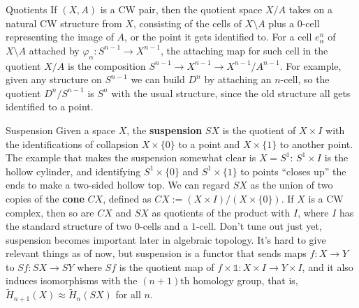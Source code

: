 \begin{namedthing}{Quotients}
    If $(X,A)$ is a CW pair, then the quotient space $X /A$ takes on a natural CW structure from $X$, consisting of the cells of $X \setminus A$ plus a $0$-cell representing the image of $A$, or the point it gets identified to. For a cell $e_{\alpha }^n $ of $X\setminus A$ attached by $\varphi _{\alpha }\colon S^{n-1} \to X^{n-1}$, the attaching map for such cell in the quotient $X /A$ is the composition $S^{n-1}\to X^{n-1}\to X^{n-1} / A^{n-1}$. For example, given any structure on $S^{n-1}$ we can build $D^n $ by attaching an $n$-cell, so the quotient $D^n /S^{n-1}$ is $S^n $ with the usual structure, since the old structure all gets identified to a point. 
\end{namedthing}
\begin{namedthing}{Suspension}
    Given a space $X$, the \textbf{suspension} $SX$ is the quotient of $X\times I$ with the identifications of collapsion $X\times \{0\} $ to a point and $X\times \{1\} $ to another point. The example that makes the suspension somewhat clear is $X=S^1 $: $S^1 \times I$ is the hollow cylinder, and identifying $S^1 \times \{0\} $ and $S^1 \times \{1\} $ to points ``closes up'' the ends to make a two-sided hollow top. We can regard $SX$ as the union of two copies of the \textbf{cone} $CX$, defined as $CX:=(X\times I) /(X\times \{0\} )$. If $X$ is a CW complex, then so are $C X$ and $SX$ as quotients of the product with $I$, where $I$ has the standard structure of two $0$-cells and a $1$-cell. Don't tune out just yet, suspension becomes important later in algebraic topology. It's hard to give relevant things as of now, but suspension is a functor that sends maps $f\colon X \to Y$ to $Sf \colon SX \to SY$ where $Sf$ is the quotient map of $f\times \mathbb 1 \colon X\times I \to Y\times I$, and it also induces isomorphisms with the $(n+1)$th homology group, that is, $\widetilde H_{n+1} (X)\approx \widetilde H_n (SX)$ for all $n$.
\end{namedthing}
